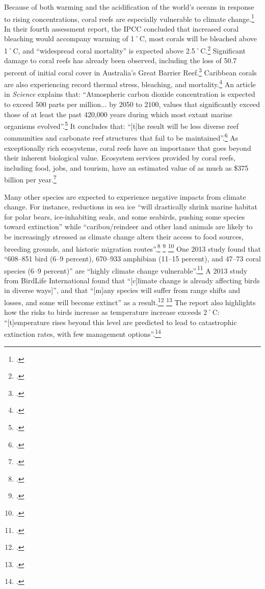 Because of both warming and the acidification of the world's oceans in response to rising  concentrations, coral reefs are especially vulnerable to climate change.\footcite[][]{CoralReefs2013}
In their fourth assessment report, the IPCC concluded that increased coral bleaching would accompany warming of 1˚C, most corals will be bleached above 1˚C, and ``widespread coral mortality'' is expected above 2.5˚C.\footcite[][p.51]{IPCCar4_syr}
Significant damage to coral reefs has already been observed, including the loss of 50.7 percent of initial coral cover in Australia's Great Barrier Reef.\footcite[][]{27declinecoral}
Caribbean corals are also experiencing record thermal stress, bleaching, and mortality.\footcite[][]{CaribbeanCorals}
An article in \emph{Science} explains that: ``Atmospheric carbon dioxide concentration is expected to exceed 500 parts per million... by 2050 to 2100, values that significantly exceed those of at least the past 420,000 years during which most extant marine organisms evolved''.\footcite[][p. 1737--1742]{CoralRapidCC}
It concludes that: ``[t]he result will be less diverse reef communities and carbonate reef structures that fail to be maintained''.\footcite[][p. 1737--1742]{CoralRapidCC}
As exceptionally rich ecosystems, coral reefs have an importance that goes beyond their inherent biological value.
Ecosystem services provided by coral reefs, including food, jobs, and tourism, have an estimated value of as much as \$375 billion per year.\footcite[][]{NOAACoral}



Many other species are expected to experience negative impacts from climate change.
For instance, reductions in sea ice ``will drastically shrink marine habitat for polar bears, ice-inhabiting seals, and some seabirds, pushing some species toward extinction'' while ``caribou/reindeer and other land animals are likely to be increasingly stressed as climate change alters their access to food sources, breeding grounds, and historic migration routes''.\footcite[][Executive summary, p. 10]{ACIA2004} \footcite[See also: ][]{Post2013} \footcite[][]{Weber2013}
One 2013 study found that ``608–851 bird (6–9 percent), 670–933 amphibian (11–15 percent), and 47–73 coral species (6–9 percent)'' are ``highly climate change vulnerable''.\footcite[][p. 1]{VulnerableSpecies}
A 2013 study from BirdLife International found that ``[c]limate change is already affecting birds in diverse ways]'', and that ``[m]any species will suffer from range shifts and losses, and some will become extinct'' as a result.\footcite[][p. 15]{StateWorldBirds} \footcite[See also: ][]{CBCBirdLife}
The report also highlights how the risks to birds increase as temperature increase exceeds 2˚C: ``[t]emperature rises beyond this level are predicted to lead to catastrophic extinction rates, with few management options''.\footcite[][]{BirdLifeCC}



